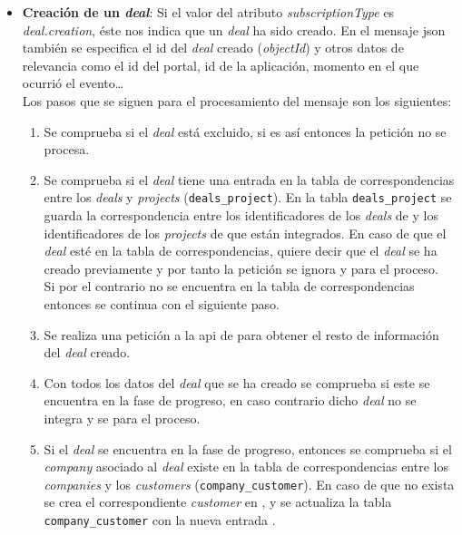 \begin{itemize}
	\item \textbf{Creación de un \textit{deal}}: Si el valor del atributo \textit{subscriptionType} es \textit{deal.creation}, éste nos indica que un \textit{deal} ha sido creado.
		En el mensaje \acrshort{json} también se especifica el id del \textit{deal} creado (\textit{objectId}) y otros datos de relevancia como el id del portal, id de la aplicación, momento en el que ocurrió el evento\ldots \\
	
		
		Los pasos que se siguen para el procesamiento del mensaje son los siguientes:
		
		\begin{enumerate}
			\item Se comprueba si el \textit{deal} está excluido, si es así entonces la petición no se procesa.
		
			\item Se comprueba si el \textit{deal} tiene una entrada en la tabla de correspondencias entre los \textit{deals} y \textit{projects} (\texttt{deals\_project}).
		En la tabla \texttt{deals\_project} se guarda la correspondencia entre los identificadores de los \textit{deals} de \hs{} y los identificadores de los \textit{projects} de \wday{} que están integrados.
		En caso de que el \textit{deal} esté en la tabla de correspondencias, quiere decir que el \textit{deal} se ha creado previamente y por tanto la petición se ignora y para el proceso.\\
		
		Si por el contrario no se encuentra en la tabla de correspondencias entonces se continua con el siguiente paso.
		
			\item Se realiza una petición a la \acrshort{api} de \hs{} para obtener el resto de información del \textit{deal} creado.
			\item Con todos los datos del \textit{deal} que se ha creado se comprueba si este se encuentra en la fase de progreso, en caso contrario dicho \textit{deal} no se integra y se para el proceso.
			\item Si el \textit{deal} se encuentra en la fase de progreso, entonces se comprueba si el \textit{company} asociado al \textit{deal} existe en la tabla de correspondencias entre los \textit{companies} y los \textit{customers} (\texttt{company\_customer}).
			En caso de que no exista se crea el correspondiente \textit{customer} en \wday{}, y se actualiza la tabla \texttt{company\_customer} con la nueva entrada .
			

\end{enumerate}
\end{itemize}
